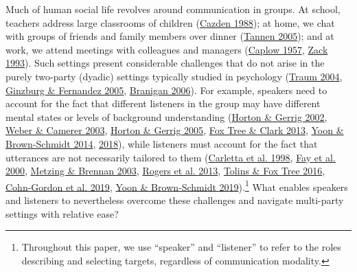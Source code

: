 \documentclass[
  english,
  a4paper,
]{article}
\begin{document}
Much of human social life revolves around communication in groups.
At school, teachers address large classrooms of children (\protect\hyperlink{ref-cazden1988classroom}{Cazden 1988}); at home, we chat with groups of friends and family members over dinner (\protect\hyperlink{ref-tannen2005conversational}{Tannen 2005}); and at work, we attend meetings with colleagues and managers (\protect\hyperlink{ref-caplow1957organizational}{Caplow 1957}, \protect\hyperlink{ref-zack1993interactivity}{Zack 1993}).
Such settings present considerable challenges that do not arise in the purely two-party (dyadic) settings typically studied in psychology (\protect\hyperlink{ref-traum2004}{Traum 2004}, \protect\hyperlink{ref-ginzburg2005}{Ginzburg \& Fernandez 2005}, \protect\hyperlink{ref-branigan2006}{Branigan 2006}).
For example, speakers need to account for the fact that different listeners in the group may have different mental states or levels of background understanding (\protect\hyperlink{ref-horton2002}{Horton \& Gerrig 2002}, \protect\hyperlink{ref-weber2003}{Weber \& Camerer 2003}, \protect\hyperlink{ref-horton2005}{Horton \& Gerrig 2005}, \protect\hyperlink{ref-fox-tree2013}{Fox Tree \& Clark 2013}, \protect\hyperlink{ref-yoon2014}{Yoon \& Brown-Schmidt 2014}, \protect\hyperlink{ref-yoon2018}{2018}), while listeners must account for the fact that utterances are not necessarily tailored to them (\protect\hyperlink{ref-carletta1998}{Carletta et al. 1998}, \protect\hyperlink{ref-fay2000}{Fay et al. 2000}, \protect\hyperlink{ref-metzing2003}{Metzing \& Brennan 2003}, \protect\hyperlink{ref-rogers2013}{Rogers et al. 2013}, \protect\hyperlink{ref-tolins2016}{Tolins \& Fox Tree 2016}, \protect\hyperlink{ref-cohngordon}{Cohn-Gordon et al. 2019}, \protect\hyperlink{ref-yoon2019}{Yoon \& Brown‐Schmidt 2019}).\footnote{Throughout this paper, we use ``speaker'' and ``listener'' to refer to the roles describing and selecting targets, regardless of communication modality.}
What enables speakers and listeners to nevertheless overcome these challenges and navigate multi-party settings with relative ease?
\end{document}
